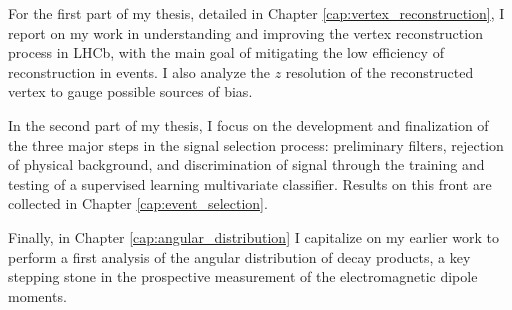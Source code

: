 For the first part of my thesis, detailed in Chapter \ref{cap:vertex_reconstruction}, I report on my work in understanding and improving the vertex reconstruction process in LHCb, with the main goal of mitigating the low efficiency of \lambdadecay reconstruction in \demonstratorshort events.
I also analyze the $z$ resolution of the reconstructed \lz vertex to gauge possible sources of bias.

In the second part of my thesis, I focus on the development and finalization of the three major steps in the signal selection process: preliminary filters, rejection of \physbkgshort physical background,
and discrimination of signal through the training and testing of a supervised learning multivariate classifier.
Results on this front are collected in Chapter \ref{cap:event_selection}.

Finally, in Chapter \ref{cap:angular_distribution} I capitalize on my earlier work to perform a first analysis of the angular distribution of \lambdadecay decay products, a key stepping stone in the prospective measurement of the \lz electromagnetic dipole moments.